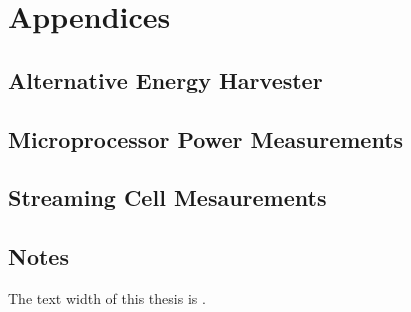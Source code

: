 \part{Appendices}
    \appendix
    \chapter{Alternative Energy Harvester}
        
    \chapter{Microprocessor Power Measurements}
        
    \chapter{Streaming Cell Mesaurements}
        

\chapter*{Notes}
The text width of this thesis is \the\textwidth.








